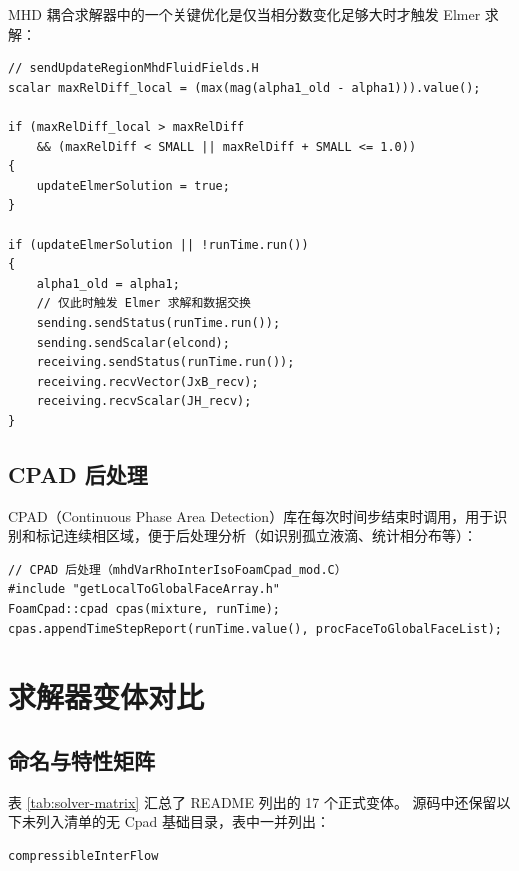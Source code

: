 \documentclass[11pt,a4paper]{article}
\begin{document}
MHD 耦合求解器中的一个关键优化是仅当相分数变化足够大时才触发 Elmer 求解：

\begin{lstlisting}[style=cppstyle]
// sendUpdateRegionMhdFluidFields.H
scalar maxRelDiff_local = (max(mag(alpha1_old - alpha1))).value();

if (maxRelDiff_local > maxRelDiff 
    && (maxRelDiff < SMALL || maxRelDiff + SMALL <= 1.0))
{
    updateElmerSolution = true;
}

if (updateElmerSolution || !runTime.run())
{
    alpha1_old = alpha1;
    // 仅此时触发 Elmer 求解和数据交换
    sending.sendStatus(runTime.run());
    sending.sendScalar(elcond);
    receiving.sendStatus(runTime.run());
    receiving.recvVector(JxB_recv);
    receiving.recvScalar(JH_recv);
}
\end{lstlisting}

\subsection{CPAD 后处理}

CPAD（Continuous Phase Area Detection）库在每次时间步结束时调用，用于识别和标记连续相区域，便于后处理分析（如识别孤立液滴、统计相分布等）：

\begin{lstlisting}[style=cppstyle]
// CPAD 后处理（mhdVarRhoInterIsoFoamCpad_mod.C）
#include "getLocalToGlobalFaceArray.h"
FoamCpad::cpad cpas(mixture, runTime);
cpas.appendTimeStepReport(runTime.value(), procFaceToGlobalFaceList);
\end{lstlisting}

\section{求解器变体对比}

\subsection{命名与特性矩阵}

表 \ref{tab:solver-matrix} 汇总了 README 列出的 17 个正式变体。
源码中还保留以下未列入清单的无 Cpad 基础目录，表中一并列出：
\begin{lstlisting}[style=cppstyle,numbers=none]
compressibleInterFlow
\end{lstlisting}
\end{document}
